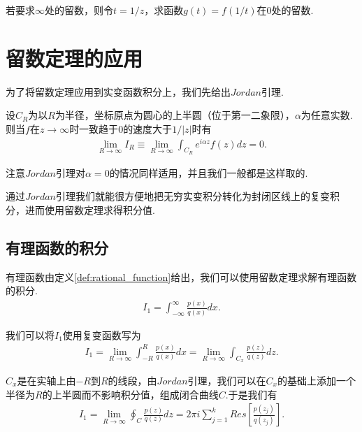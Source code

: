         \begin{remark}
            若要求$\infty$处的留数，则令$t=1/z$，求函数$g(t)=f(1/t)$在$0$处的留数.
        \end{remark}

\section{留数定理的应用}
    为了将留数定理应用到实变函数积分上，我们先给出$Jordan$引理.
    \begin{lemma}[$Jordan$引理]\label{lem:Jordan_lemma}
        设$C_R$为以$R$为半径，坐标原点为圆心的上半圆（位于第一二象限），$\alpha$为任意实数.则当$f$在$z\to\infty$时一致趋于$0$的速度大于$1/|z|$时有
        \begin{align*}
            \lim_{R\to\infty}I_R\equiv \lim_{R\to\infty}\int_{C_R}e^{i\alpha z}f(z)dz=0.
        \end{align*}

    \end{lemma}

    \begin{remark}
        注意$Jordan$引理对$\alpha =0$的情况同样适用，并且我们一般都是这样取的.
    \end{remark}

    通过$Jordan$引理我们就能很方便地把无穷实变积分转化为封闭区线上的复变积分，进而使用留数定理求得积分值.

    \subsection{有理函数的积分}

    有理函数由定义\ref{def:rational_function}给出，我们可以使用留数定理求解有理函数的积分.
    \begin{align*}
        I_1=\int_{-\infty}^{\infty}\frac{p(x)}{q(x)}dx.
    \end{align*}

    我们可以将$I_1$使用复变函数写为
    \begin{align*}
        I_1=\lim_{R\to\infty}\int_{-R}^{R}\frac{p(x)}{q(x)}dx=\lim_{R\to\infty}\int_{C_x}\frac{p(z)}{q(z)}dz.
    \end{align*}

    $C_x$是在实轴上由$-R$到$R$的线段，由$Jordan$引理，我们可以在$C_x$的基础上添加一个半径为$R$的上半圆而不影响积分值，组成闭合曲线$C$.于是我们有
    \begin{align*}
        I_1=\lim_{R\to\infty}\oint_{C}\frac{p(z)}{q(z)}dz=2\pi i\sum_{j=1}^{k}Res\left[\frac{p(z_j)}{q(z_j)}\right].
    \end{align*}

